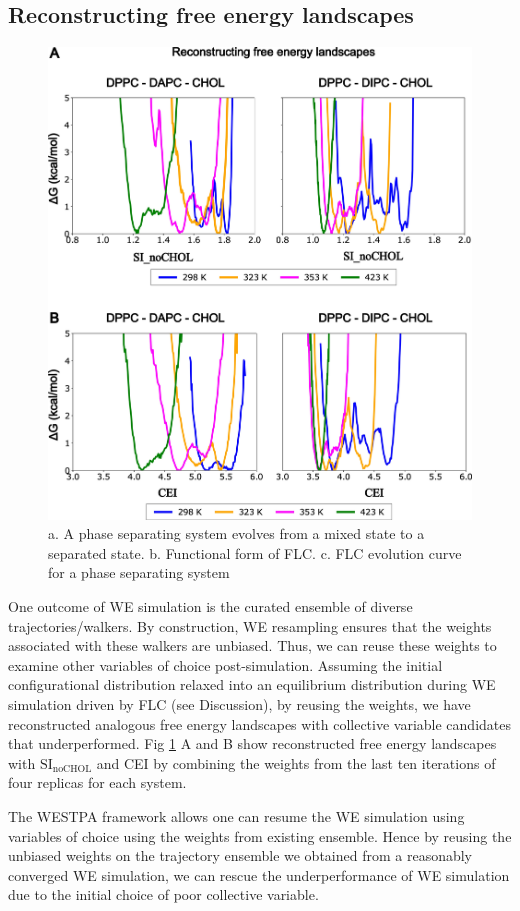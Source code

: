 \documentclass{biophys-new}
\begin{document}
\subsection*{Reconstructing free energy landscapes}

\begin{figure}[hbt!]
\centering
\includegraphics[width=0.75\linewidth]{Figures/Main/6/placeholder.jpg}
\caption{a. A phase separating system evolves from a mixed state to a separated state. b. Functional form of FLC. c. FLC evolution curve for a phase separating system}
\label{figs6:view}
\end{figure}

One outcome of WE simulation is the curated ensemble of diverse trajectories/walkers.
By construction, WE resampling ensures that the weights associated with these walkers are unbiased.
Thus, we can reuse these weights to examine other variables of choice post-simulation.
Assuming the initial configurational distribution relaxed into an equilibrium distribution during WE simulation driven by FLC (see Discussion), 
by reusing the weights, we have reconstructed analogous free energy landscapes with collective variable candidates that underperformed.
Fig \ref{figs6:view} A and B show reconstructed free energy landscapes with $\text{SI}_{\text{noCHOL}}$ and CEI by combining the weights from the last ten iterations of four replicas for each system.

The WESTPA framework allows one can resume the WE simulation using variables of choice using the weights from existing ensemble\cite{Zhang2010, Zwier2015}.
Hence by reusing the unbiased weights on the trajectory ensemble we obtained from a reasonably converged WE simulation,
we can rescue the underperformance of WE simulation due to the initial choice of poor collective variable.
\end{document}
